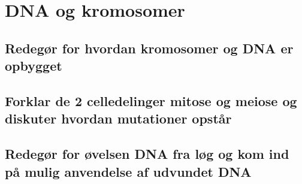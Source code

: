 \newpage
\section{DNA og kromosomer}
\subsection{Redegør for hvordan kromosomer og DNA er opbygget}
\subsection{Forklar de 2 celledelinger mitose og meiose og diskuter hvordan mutationer opstår}
\subsection{Redegør for øvelsen DNA fra løg og kom ind på mulig anvendelse af udvundet DNA}